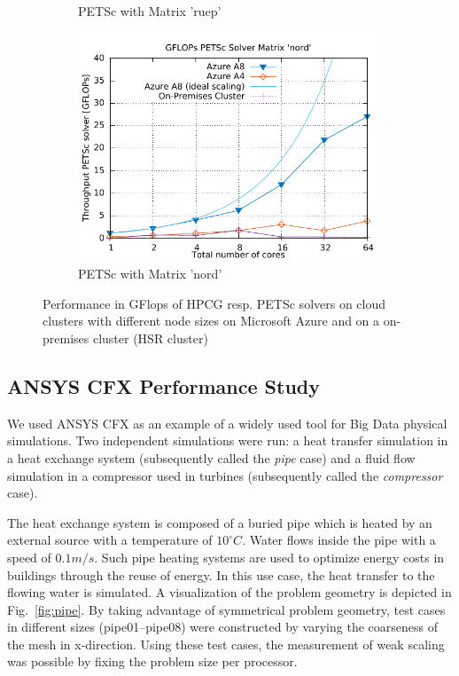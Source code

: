 \documentclass[3p,times]{elsarticle}
\begin{document}
\begin{figure}[h]
\begin{subfigure}{.33\textwidth}
	\caption{PETSc with Matrix 'ruep'}
  \label{fig:ruep}
\end{subfigure}%
\begin{subfigure}{.33\textwidth}
  \centering
  \includegraphics[width=\linewidth]{gplt-gflops-nord}
	\caption{PETSc with Matrix 'nord'}
  \label{fig:nord}
\end{subfigure}

\caption{Performance in GFlops of HPCG resp. PETSc solvers on cloud clusters with different node sizes on Microsoft Azure and on a on-premises cluster (HSR cluster) }
\label{fig:test}
\end{figure}


\subsection{ANSYS CFX Performance Study}
We used ANSYS CFX as an example of a widely used tool for Big Data physical simulations.
Two independent simulations were run: a heat transfer simulation in a heat exchange system (subsequently called the \textit{pipe} case) and a fluid flow simulation in a compressor used in turbines (subsequently called the \textit{compressor} case).

The heat exchange system is composed of a buried pipe which is heated by an external source with a temperature of  $10 ^\circ C$. Water flows inside the pipe with a speed of $0.1m/s$. Such pipe heating systems are used to optimize energy costs in buildings through the reuse of energy. In this use case, the heat transfer to the flowing water is simulated. A visualization of the problem geometry is depicted in Fig.~\ref{fig:pipe}. By taking advantage of symmetrical problem geometry, test cases in different sizes (pipe01--pipe08) were constructed by varying the coarseness of the mesh in x-direction. Using these test cases, the measurement of weak scaling was possible by fixing the problem size per processor.
\end{document}
